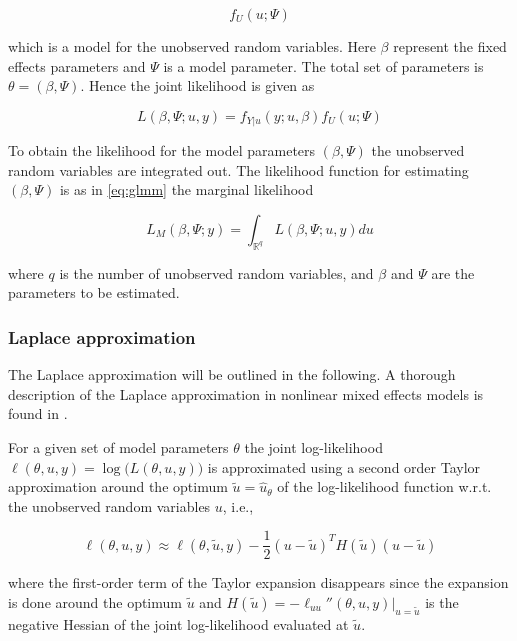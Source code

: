 \documentclass[preprint, 3p, authoryear]{elsarticle} %
\begin{document}
\begin{equation}\label{eq:secondStage}
  f_{U}(u; \Psi)
\end{equation}

which is a model for the unobserved random variables. Here \(\beta\) represent the fixed effects parameters and \(\Psi\) is a model parameter. The total set of parameters is \(\theta=(\beta, \Psi)\). Hence the joint likelihood is given as

\begin{equation}\label{eq:jl}
  L(\beta, \Psi; u, y)=f_{Y|u}(y;u,\beta) f_{U}(u; \Psi)
\end{equation}

To obtain the likelihood for the model parameters \((\beta, \Psi)\) the unobserved random variables are integrated out. The likelihood function for estimating \((\beta, \Psi)\) is as in \eqref{eq:glmm} the marginal likelihood

\begin{equation}\label{eq:glmm2}
  L_{M}(\beta, \Psi; y)=\int_{\mathbb{R}^{q}} L(\beta, \Psi;u,y) du
\end{equation}

where \(q\) is the number of unobserved random variables, and \(\beta\) and \(\Psi\) are the parameters to be estimated.

\hypertarget{laplace-approximation}{%
\subsubsection{Laplace approximation}\label{laplace-approximation}}

The Laplace approximation will be outlined in the following. A thorough description of the Laplace approximation in nonlinear mixed effects models is found in \citet{Wolfinger_1997}.

For a given set of model parameters \(\theta\) the joint log-likelihood \(\ell(\theta, u, y)=\log\big(L(\theta, u, y)\big)\) is approximated using a second order Taylor approximation around the optimum \(\tilde{u}=\hat{u}_\theta\) of the log-likelihood function w.r.t. the unobserved random variables \(u\), i.e.,

\begin{equation}\label{eq:laplaceApprox}
  \ell(\theta, u, y)\approx\ell(\theta, \tilde{u}, y) - \frac{1}{2}(u-\tilde{u})^T H(\tilde{u})(u-\tilde{u})
\end{equation}

where the first-order term of the Taylor expansion disappears since the expansion is done around the optimum \(\tilde {u}\) and \(H(\tilde{u})=-\ell_{uu}''(\theta, u, y)|_{u=\tilde{u}}\) is the negative Hessian of the joint log-likelihood evaluated at \(\tilde{u}\).
\end{document}
